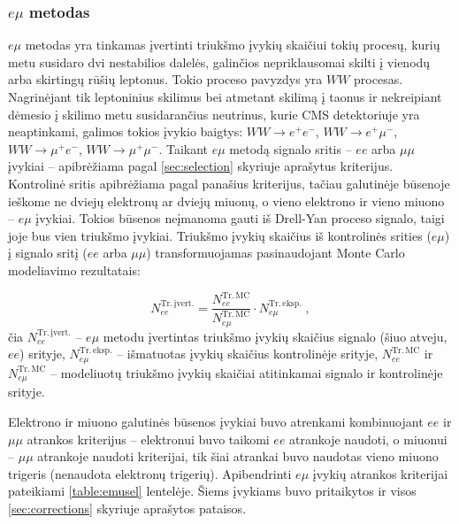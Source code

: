 \documentclass[a4paper, 12pt, oneside]{article}
\newcommand{\emu}{e\mu}
\newlength\q
\begin{document}
\subsubsection{$\emu$ metodas}\label{sec:SignalBkg}

$\emu$ metodas yra tinkamas įvertinti triukšmo įvykių skaičiui tokių procesų, kurių metu susidaro dvi
nestabilios dalelės, galinčios nepriklausomai skilti į vienodų arba skirtingų rūšių leptonus.
Tokio proceso pavyzdys yra $WW$ procesas.
Nagrinėjant tik leptoninius skilimus bei atmetant skilimą į taonus ir nekreipiant dėmesio į skilimo metu
susidarančius neutrinus, kurie CMS detektoriuje yra neaptinkami,
galimos tokios įvykio baigtys: $WW\rightarrow e^{+} e^{-}$, $WW\rightarrow e^{+}\mu^{-}$,
$WW\rightarrow \mu^{+}e^{-}$, $WW\rightarrow \mu^{+}\mu^{-}$.
Taikant $\emu$ metodą signalo sritis -- $ee$ arba $\mu\mu$ įvykiai -- apibrėžiama pagal \ref{sec:selection} skyriuje
aprašytus kriterijus.
Kontrolinė sritis apibrėžiama pagal panašius kriterijus, tačiau galutinėje būsenoje ieškome
ne dviejų elektronų ar dviejų miuonų, o vieno elektrono ir vieno miuono -- $\emu$ įvykiai.
Tokios būsenos neįmanoma gauti iš Drell-Yan proceso signalo, taigi joje bus vien triukšmo įvykiai.
Triukšmo įvykių skaičius iš kontrolinės srities ($\emu$) į signalo sritį ($ee$ arba $\mu\mu$)
transformuojamas pasinaudojant Monte Carlo modeliavimo rezultatais:

\begin{equation}
	N_{ee}^{\mathrm{Tr. \, įvert.}} =
	\frac{ N_{ee}^{\mathrm{Tr. \, MC}} }{ N_{e\mu}^{\mathrm{Tr. \, MC}} }
	\cdot N_{e\mu}^{\mathrm{Tr. \, eksp.}} \; ,
	\label{eq:emuMethod}
\end{equation}
čia $N_{ee}^{\mathrm{Tr. \, įvert.}}$ -- $\emu$ metodu įvertintas triukšmo įvykių skaičius signalo
(šiuo atveju, $ee$) srityje, $N_{e\mu}^{\mathrm{Tr. \, eksp.}}$ -- išmatuotas įvykių skaičius
kontrolinėje srityje, $N_{ee}^{\mathrm{Tr. \, MC}}$ ir $N_{e\mu}^{\mathrm{Tr. \, MC}}$ -- modeliuotų
triukšmo įvykių skaičiai atitinkamai signalo ir kontrolinėje srityje.

Elektrono ir miuono galutinės būsenos įvykiai buvo atrenkami kombinuojant $ee$ ir $\mu\mu$ atrankos
kriterijus -- elektronui buvo taikomi $ee$ atrankoje naudoti, o miuonui -- $\mu\mu$ atrankoje naudoti
kriterijai, tik šiai atrankai buvo naudotas vieno miuono trigeris (nenaudota elektronų trigerių).
Apibendrinti $e\mu$ įvykių atrankos kriterijai pateikiami \ref{table:emusel} lentelėje.
Šiems įvykiams buvo pritaikytos ir visos \ref{sec:corrections} skyriuje aprašytos pataisos.
\end{document}
